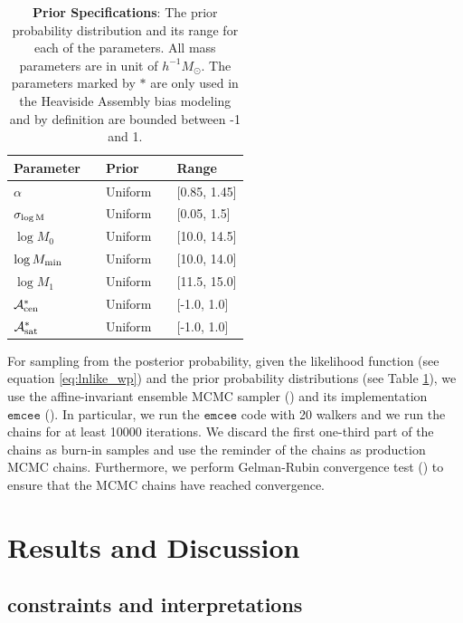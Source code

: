 \documentclass[12pt, preprint]{aastex}
\newcommand{\mzero}{\log M_{0}}
\newcommand{\mone}{\log M_{1}}
\newcommand{\mmin}{\log M_{\rm min}}
\newcommand{\sigmam}{\sigma_{\log \rm M}}
\newcommand{\acen}{\mathcal{A}_{\rm cen}}
\newcommand{\asat}{\mathcal{A}_{\rm sat}}
\begin{document}
\begin{table}
\begin{center}
  \label{tab:prior}
  \caption{{\bf Prior Specifications}: The prior probability distribution 
  and its range for each of the parameters. 
  All mass parameters are in unit of $h^{-1}M_\odot$. The parameters marked by $*$ are only used in the Heaviside Assembly bias modeling and by definition are bounded between -1 and 1.}
\begin{tabular}{@{}lllll}
\\ \hline 
    Parameter & & Prior & & Range \\ \hline
  $\alpha$ & & Uniform & & [0.85, 1.45] \\
  $\sigmam$ & & Uniform & &  [0.05, 1.5] \\
   $\mzero$   & & Uniform & &  [10.0, 14.5] \\
  $\mmin$ & &   Uniform & &  [10.0, 14.0] \\
  $\mone$ & & Uniform & & [11.5, 15.0] \\ 
  $\acen^{*}$ & & Uniform & & [-1.0, 1.0] \\
  $\asat^{*}$ & & Uniform & & [-1.0, 1.0] \\
 \hline
  \end{tabular}
\end{center}
\end{table}

For sampling from the posterior probability, given the likelihood function (see equation \ref{eq:lnlike_wp}) and the prior probability distributions (see Table \ref{tab:prior}), we use the affine-invariant ensemble MCMC sampler (\citealt{goodmanweare}) and its implementation $\mathtt{emcee}$ (\citealt{emcee}). In particular, we run the $\mathtt{emcee}$ code with 20 walkers and we run the chains for at least 10000 iterations. We discard the first one-third part of the chains as burn-in samples and use the reminder of the chains as production MCMC chains. Furthermore, we perform Gelman-Rubin convergence test (\citealt{grtest}) to ensure that the MCMC chains have reached convergence.


\section{Results and Discussion}\label{sec:result}

\subsection{constraints and interpretations}
\end{document}
